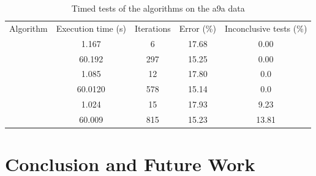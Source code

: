 \begin{table}[htbp]
\centering
\begin{tabular}{|c|c|c|c|c|}
\hline
Algorithm & Execution time (s) & Iterations & Error (\%) & Inconclusive tests (\%)  \\ \hhline{|=|=|=|=|=|}
\multirow{ 2}{*}{\adaB} & 1.167 & 6 & 17.68 & 0.00  \\\cline{2-5}
& 60.192 & 297 &  15.25 & 0.00  \\ \Xhline{1pt}
\multirow{ 2}{*}{\NHB} & 1.085 & 12 & 17.80  & 0.0 \\\cline{2-5}
& 60.0120 & 578 &  15.14 & 0.0  \\ \Xhline{1pt}
\multirow{ 2}{*}{\squintB} & 1.024 & 15 & 17.93  & 9.23\\\cline{2-5}
 & 60.009 & 815 &  15.23  &  13.81\\ \hline
\end{tabular}
\caption{Timed tests of the algorithms on the a9a data}
\label{table2}
\end{table}

 \section{Conclusion and Future Work}